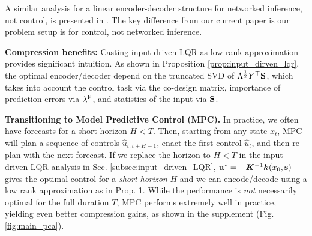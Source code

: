 A similar analysis for a linear encoder-decoder structure for networked inference, not control, is presented in \cite{DBLP:conf/rss/NakanoyaCADKP21}. The key difference from our current paper is our problem setup is for control, not networked inference. 

\textbf{Compression benefits: }
Casting input-driven LQR as low-rank approximation provides significant intuition.
As shown in Proposition \ref{prop:input_dirven_lqr}, the optimal encoder/decoder depend on the truncated SVD of $\Lambda^{\frac{1}{2}} Y^\top \bold{S}$, which takes into account the control task via the co-design matrix, importance of prediction errors via $\lambda^{\mathrm{F}}$, and statistics of the input via $\bold{S}$.  

\textbf{Transitioning to Model Predictive Control (MPC).}
In practice, we often have forecasts for a short horizon $H < T$. Then, starting from any state $x_t$, MPC will plan a sequence of controls $\hat{u}_{t:t+H-1}$, enact the first control $\hat{u}_t$, and then re-plan with the next forecast. If we replace the horizon to $H < T$ in the input-driven LQR analysis in Sec. \ref{subsec:input_driven_LQR}, $\bold{u}^{*} = - \bm{K}^{-1} \bm{k}(x_0, \bold{s})$ gives the optimal control for a \textit{short-horizon} $H$ and we can encode/decode using a low rank approximation as in Prop. 1. While the performance is \textit{not} necessarily optimal for the full duration $T$, MPC performs extremely well in practice, yielding even better compression gains, as shown in the supplement (Fig. \ref{fig:main_pca}). 



